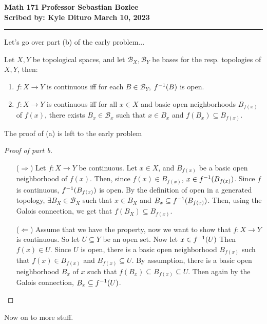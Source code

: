 \documentclass[12pt, twosided]{article}
\begin{document}
\noindent \textbf{Math 171} \hfill \textbf{Professor Sebastian Bozlee} \\
\textbf{Scribed by: Kyle Dituro} \hfill \textbf{March 10, 2023}\hrule
\vspace{.2in}

Let's go over part (b) of the early problem...

\begin{prop}
  Let \(X, Y\) be topological spaces, and let \(\mathcal{B}_X, \mathcal{B}_Y\) be bases for the resp. topologies of \(X, Y\), then:

  \begin{enumerate}
  \item \(f: X \to Y\) is continuous iff for each \(B \in \mathcal{B}_Y\), \(f^{-1}(B)\) is open.
  \item \(f: X \to Y\) is continuous iff for all \(x \in X\) and basic open neighborhoods \(B_{f(x)}\) of \(f(x)\), there exists \(B_x \in \mathcal{B}_x\) such that \(x \in B_x\) and \(f(B_x) \subseteq B_{f(x)}\).
  \end{enumerate}
\end{prop}
The proof of (a) is left to the early problem
\begin{proof}[Proof of part b]
  \begin{enumerate}
  \item [(\(\Rightarrow\))] Let \(f: X \to Y\) be continuous. Let \(x \in X\), and \(B_{f(x)}\) be a basic open neighborhood of \(f(x)\). Then, since \(f(x) \in B_{f(x)}\), \(x \in f^{-1}(B_{f(x)})\). Since \(f\) is continuous, \(f^{-1}(B_{f(x)})\) is open. By the definition of open in a generated topology, \(\exists B_X \in \mathcal{B}_X\) such that \(x \in B_X\) and \(B_x \subseteq f^{-1}(B_{f(x)})\). Then, using the Galois connection, we get that \(f(B_X) \subseteq B_{f(x)}\).
  \item [(\(\Leftarrow\))] Assume that we have the property, now we want to show that \(f: X \to Y\) is continuous. So let \(U \subseteq Y\) be an open set. Now let \(x \in f^{-1}(U)\) Then \(f(x) \in U\). Since \(U\) is open, there is a basic open neighborhood \(B_{f(x)}\) such that \(f(x) \in B_{f(x)}\) and \(B_{f(x)} \subseteq U\). By assumption, there is a basic open neighborhood \(B_x\) of \(x\) such that \(f(B_x) \subseteq B_{f(x)} \subseteq U\). Then again by the Galois connection, \(B_x \subseteq f^{-1}(U)\).
  \end{enumerate}
\end{proof}

  Now on to more stuff.
\end{document}
